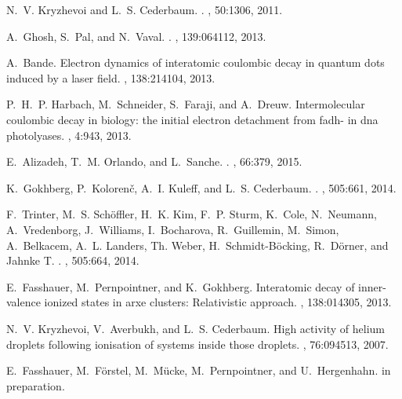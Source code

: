 \documentclass[12pt,twocolumn]{iopart}
\begin{document}
\begin{thebibliography}{10}
N.~V. Kryzhevoi and L.~S. Cederbaum.
.
, 50:1306, 2011.

A.~Ghosh, S.~Pal, and N.~Vaval.
.
, 139:064112, 2013.

A.~Bande.
\newblock Electron dynamics of interatomic coulombic decay in quantum dots
  induced by a laser field.
, 138:214104, 2013.

P.~H.~P. Harbach, M.~Schneider, S.~Faraji, and A.~Dreuw.
\newblock Intermolecular coulombic decay in biology: the initial electron
  detachment from fadh- in dna photolyases.
, 4:943, 2013.

E.~Alizadeh, T.~M. Orlando, and L.~Sanche.
.
, 66:379, 2015.

K.~Gokhberg, P.~Koloren\v{c}, A.~I. Kuleff, and L.~S. Cederbaum.
.
, 505:661, 2014.

F.~Trinter, M.~S. Sch{\"o}ffler, H.~K. Kim, F.~P. Sturm, K.~Cole, N.~Neumann,
  A.~Vredenborg, J.~Williams, I.~Bocharova, R.~Guillemin, M.~Simon,
  A.~Belkacem, A.~L. Landers, Th. Weber, H.~Schmidt-B{\"o}cking, R.~D{\"o}rner,
  and Jahnke T.
.
, 505:664, 2014.

E.~Fasshauer, M.~Pernpointner, and K.~Gokhberg.
\newblock Interatomic decay of inner-valence ionized states in arxe clusters:
  Relativistic approach.
, 138:014305, 2013.

N.~V. Kryzhevoi, V.~Averbukh, and L.~S. Cederbaum.
\newblock High activity of helium droplets following ionisation of systems
  inside those droplets.
, 76:094513, 2007.

E.~Fasshauer, M.~F\"orstel, M.~M\"ucke, M.~Pernpointner, and U.~Hergenhahn.
\newblock in preparation.


\end{thebibliography}
\end{document}
